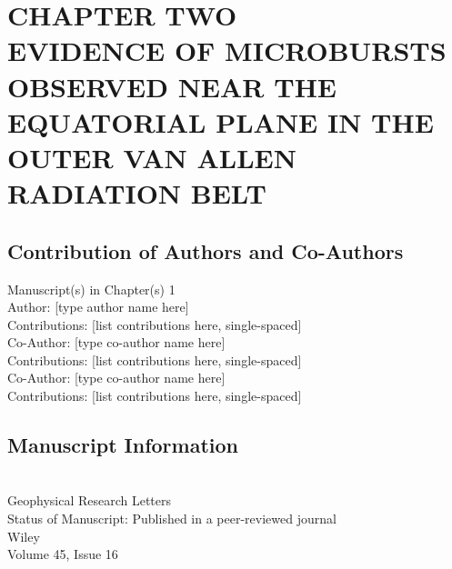 \chapter{CHAPTER TWO \\ EVIDENCE OF MICROBURSTS OBSERVED NEAR THE EQUATORIAL PLANE IN THE OUTER VAN ALLEN RADIATION BELT}\label{CH:mageis_microburst}

\section{Contribution of Authors and Co-Authors} 
\noindent Manuscript(s) in Chapter(s) 1 \\ 

\noindent Author: [type author name here] \\
Contributions: [list contributions here, single-spaced] \\
Co-Author: [type co-author name here] \\
Contributions: [list contributions here, single-spaced] \\
Co-Author: [type co-author name here] \\
Contributions: [list contributions here, single-spaced] \\


\newpage


\iffalse
\authors{Mykhaylo Shumko\affil{1, 2}, Drew L. Turner\affil{2}, T. P. O'Brien\affil{2}, Seth G. Claudepierre\affil{2}, John Sample\affil{1}, D. P. Hartley\affil{3}, Joseph Fennell\affil{2}, J. Bernard Blake\affil{2}, Matina Gkioulidou\affil{4}, and Donald G. Mitchell\affil{4}}

\affiliation{1}{Department of Physics, Montana State University, Bozeman, Montana, USA}
\affiliation{2}{Space Science Applications Laboratory, The Aerospace Corporation, Los Angeles, California, USA}
\affiliation{3}{Department of Physics and Astronomy, The University of Iowa, Iowa City, Iowa, USA}
\affiliation{4}{Johns Hopkins University Applied Physics Laboratory, Laurel, Maryland, USA}
\fi

\section{Manuscript Information}

 \\
Geophysical Research Letters \\
Status of Manuscript: Published in a peer-reviewed journal \\
Wiley \\
Volume 45, Issue 16

